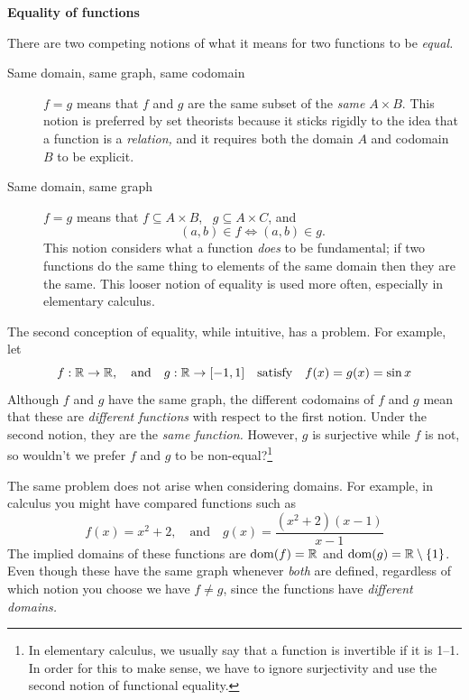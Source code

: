 \begin{aside}{}{}
{\bf Equality of functions}

There are two competing notions of what it means for two functions to be \emph{equal.}

\begin{description}
	\item[Same domain, same graph, same codomain]\quad $f=g$ means that $f$ and $g$ are the same subset of the \emph{same} $A\times B$. This notion is preferred by set theorists because it sticks rigidly to the idea that a function is a \emph{relation,} and it requires both the domain $A$ and codomain $B$ to be explicit.
	\item[Same domain, same graph]\quad $f=g$ means that $f\subseteq A\times B$, \ $g\subseteq A\times C$, and
	\[(a,b)\in f\iff (a,b)\in g.\]
	This notion considers what a function \emph{does} to be fundamental; if two functions do the same thing to elements of the same domain then they are the same. This looser notion of equality is used more often, especially in elementary calculus.
\end{description}

The second conception of equality, while intuitive, has a problem. For example, let
\[
	f:\mathbb{R}\to\mathbb{R},\quad\text{and}\quad g:\mathbb{R}\to[-1,1]\quad\text{satisfy}\quad f(x)=g(x)=\sin x
\]
Although $f$ and $g$ have the same graph, the different codomains of $f$ and $g$ mean that these are \emph{different functions} with respect to the first notion. Under the second notion, they are the \emph{same function.} However, $g$ is surjective while $f$ is not, so wouldn't we prefer $f$ and $g$ to be non-equal?\footnote{In elementary calculus, we usually say that a function is invertible if it is 1--1. In order for this to make sense, we have to ignore surjectivity and use the second notion of functional equality.}\par


The same problem does not arise when considering domains. For example, in calculus you might have compared functions such as
\[
	f(x)=x^2+2,\quad\text{and}\quad g(x)=\frac{(x^2+2)(x-1)}{x-1}
\]
The implied domains of these functions are $\operatorname{dom}(f)=\mathbb{R}$ and $\operatorname{dom}(g)=\mathbb{R}\setminus\{1\}$. Even though these have the same graph whenever \emph{both} are defined, regardless of which notion you choose we have $f\neq g$, since the functions have \emph{different domains.}
\end{aside}
% 
% 


